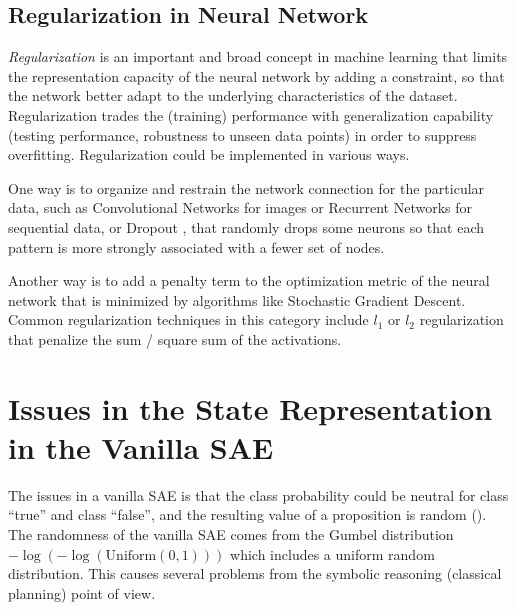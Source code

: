 \subsection{Regularization in Neural Network}

\emph{Regularization} is an important and broad concept in machine learning
that limits the representation capacity of the neural network by adding a constraint,
so that the network better adapt to the underlying characteristics of the dataset.
Regularization trades the (training) performance with generalization capability (testing performance, robustness to
unseen data points) in order to suppress overfitting.
Regularization could be implemented in various ways.

One way is to organize and restrain the network connection for the particular data,
such as Convolutional Networks for images
or Recurrent Networks for sequential data, or
Dropout \cite{srivastava2014dropout}, that randomly drops some neurons so
that each pattern is more strongly associated with a fewer set of nodes.

Another way is to add a penalty term to the optimization metric of the
neural network that is minimized by algorithms like Stochastic
Gradient Descent.
Common regularization techniques in this category include
$l_1$ or $l_2$ regularization that penalize the sum / square sum of the
activations.



\section{Issues in the State Representation in the Vanilla SAE}
\label{issues}

The issues in a vanilla SAE is that the class probability could be
neutral for class ``true'' and class ``false'', and the resulting value
of a proposition is random ().
The randomness of the vanilla SAE comes from
the Gumbel distribution $-\log (-\log (\text{Uniform}(0,1)))$ which includes
a uniform random distribution.
This causes several problems from the symbolic reasoning (classical planning) point of view.

